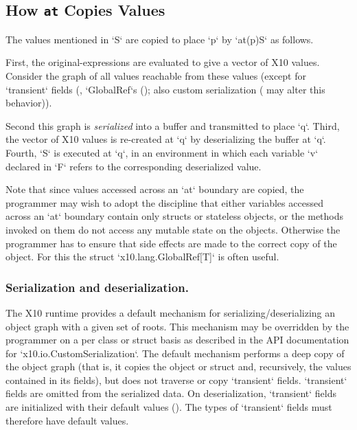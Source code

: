 \subsection{How {\tt at} Copies Values}
\label{sect:at-init-val}


The values mentioned in \xcd`S` are copied to place \xcd`p` by \xcd`at(p)S` as follows.

First, the original-expressions are evaluated to give a vector of X10 values.
Consider the graph of all values reachable from these values (except for 
\xcd`transient` fields 
(, \xcd`GlobalRef`s (); also custom
serialization ( may alter this behavior)). 

Second this graph is {\em
serialized} into a buffer and transmitted to place \xcd`q`.  Third,
the vector of X10 values is 
re-created at \xcd`q` 
by deserializing the buffer at
\xcd`q`. Fourth, \xcd`S` is executed at \xcd`q`, in an environment in
which each variable \xcd`v` declared in \xcd`F` 
refers to the corresponding deserialized value.  

Note that since values accessed across an \xcd`at` boundary are
copied, the programmer may wish to adopt the discipline that either
variables accessed across an \xcd`at` boundary  contain only structs 
or stateless objects, or the methods invoked on them do not access any
mutable state on the objects. Otherwise the programmer has to ensure
that side effects are made to the correct copy of the object. For this
the struct \xcd`x10.lang.GlobalRef[T]` is often useful.


\subsubsection{Serialization and deserialization.}
\label{sect:ser+deser}
The X10 runtime provides a default mechanism for
serializing/deserializing an object graph with a given set of roots.
This mechanism may be overridden by the programmer on a per class or
struct basis as described in the API documentation for
\xcd`x10.io.CustomSerialization`.  
The default mechanism performs a
deep copy of the object graph (that is, it copies the object or struct
and, recursively, the values contained in its fields), but does not
traverse or copy \xcd`transient` fields. \xcd`transient` fields are omitted from the
serialized data.   On deserialization, \xcd`transient` fields are initialized
with their default values ().    The types of
\xcd`transient` fields must therefore have default values.



